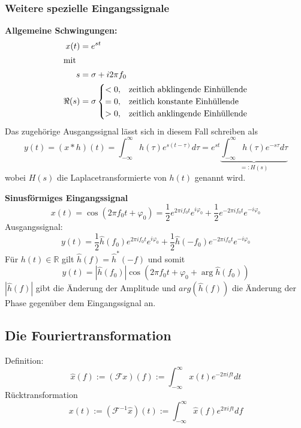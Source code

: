 \subsubsection{Weitere spezielle Eingangssignale}
\textbf{Allgemeine Schwingungen:}
\begin{align*}
    x(t)&=e^{st} \\
    \intertext{mit}
    s&=\sigma + i2\pi f_0 \\
    \Re(s) &= \sigma 
    \begin{cases}
        <0, &\text{zeitlich abklingende Einhüllende}\\
        =0, &\text{zeitlich konstante Einhüllende}\\
        >0, &\text{zeitlich anklingende Einhüllende}
    \end{cases}
\end{align*}
Das zugehörige Ausgangssignal lässt sich in diesem Fall schreiben als
\begin{equation*}
    y(t)=(x*h)(t)=\int_{-\infty}^\infty h(\tau)e^{s(t-\tau)}d\tau=e^{st}\underbrace{\int_{-\infty}^\infty h(\tau)e^{-s\tau}d\tau}_{=:H(s)}
\end{equation*}
wobei $H(s)$ die Laplacetransformierte von $h(t)$ genannt wird.

\bigskip

\textbf{Sinusförmiges Eingangssignal}
\begin{equation*}
    x(t)=\cos(2\pi f_0t+\varphi_0)=\frac{1}{2}e^{2\pi if_0t}e^{i\varphi_0}+\frac{1}{2}e^{-2\pi if_0t}e^{-i\varphi_0}
\end{equation*}
Ausgangssignal:
\begin{equation*}
    y(t)=\frac12\hat{h}(f_0)e^{2\pi if_0t}e^{i\varphi_0}+\frac12\hat{h}(-f_0)e^{-2\pi if_0t}e^{-i\varphi_0}
\end{equation*}
Für $h(t)\in\mathbb{R}$ gilt $\hat{h}(f)=\hat{h}^*(-f)$ und somit
\begin{equation*}
    y(t) = |\hat{h}(f_0)|\cos(2\pi f_0t+\varphi_0+\arg\hat{h}(f_0))
\end{equation*}
$|\hat{h}(f)|$ gibt die Änderung der Amplitude und $arg(\hat{h}(f))$ die Änderung der Phase gegenüber
dem Eingangssignal an.

\subsection{Die Fouriertransformation}
Definition:
\begin{equation*}
    \hat{x}(f):=(\mathcal{F}x)(f):=\int_{-\infty}^\infty x(t)e^{-2\pi ift}dt
\end{equation*}
Rücktransformation
\begin{equation*}
    x(t):=(\mathcal{F}^{-1}\hat{x})(t):=\int_{-\infty}^\infty\hat{x}(f)e^{2\pi ift}df
\end{equation*}

